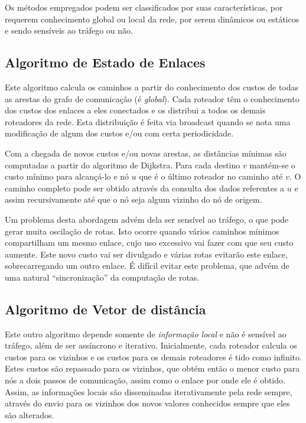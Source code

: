 Os métodos empregados podem ser classificados por suas características, por requerem conhecimento global ou local da rede, 
por serem dinâmicos ou estáticos e sendo sensíveis ao tráfego ou não.

\subsection{Algoritmo de Estado de Enlaces}

Este algoritmo calcula os caminhos a partir do conhecimento dos custos de todas as arestas do grafo de comunicação (é \emph{global}).
Cada roteador têm o conhecimento dos custos dos enlaces a eles conectados e os distribui a todos os demais roteadores da rede.
Esta distribuição é feita via broadcast quando se nota uma modificação de algum dos custos e/ou com certa periodicidade.

Com a chegada de novos custos e/ou novas arestas, as distâncias mínimas são computadas a partir do algoritmo de Dijkstra.
Para cada destino $v$ mantém-se o custo mínimo para alcançá-lo e nó $u$ que é o último roteador no caminho até $v$.
O caminho completo pode ser obtido através da consulta dos dados referentes a $u$ e assim recursivamente até que o nó seja algum vizinho do nó de origem.

Um problema desta abordagem advém dela ser sensível ao tráfego, o que pode gerar muita oscilação de rotas.
Isto ocorre quando vários caminhos mínimos compartilham um mesmo enlace, cujo uso excessivo vai fazer com que seu custo aumente.
Este novo custo vai ser divulgado e várias rotas evitarão este enlace, sobrecarregando um outro enlace.
É difícil evitar este problema, que advém de uma natural ``sincronização'' da computação de rotas.

\subsection{Algoritmo de Vetor de distância}

Este outro algoritmo depende somente de \emph{informação local} e não é sensível ao tráfego, além de ser assíncrono e iterativo.
Inicialmente, cada roteador calcula os custos para os vizinhos e os custos para os demais roteadores é tido como infinito.
Estes custos são repassado para os vizinhos, que obtém então o menor custo para nós a dois passos de comunicação, assim como o enlace por onde ele é obtido.
Assim, as informações locais são disseminadas iterativamente pela rede sempre, através do envio para os vizinhos dos novos valores conhecidos sempre que eles são alterados.

